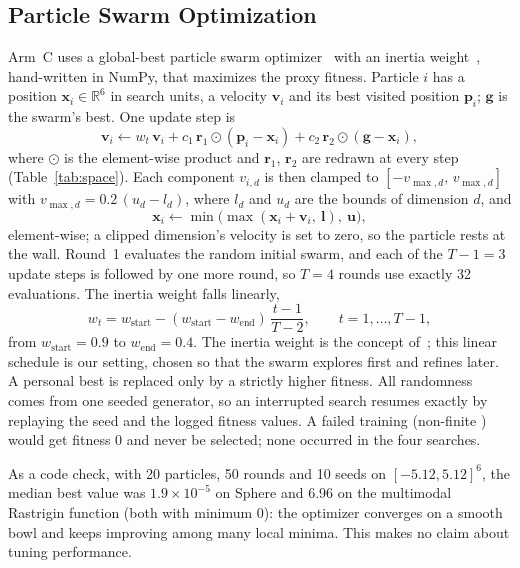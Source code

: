 \subsection{Particle Swarm Optimization}
\label{subsec:pso}

Arm~C uses a global-best particle swarm optimizer~\cite{kennedy1995particle} with an inertia weight~\cite{shi1998modified}, hand-written in NumPy, that maximizes the proxy fitness. Particle $i$ has a position $\mathbf{x}_i \in \mathbb{R}^6$ in search units, a velocity $\mathbf{v}_i$ and its best visited position $\mathbf{p}_i$; $\mathbf{g}$ is the swarm's best. One update step is
\begin{equation}
\mathbf{v}_i \leftarrow w_t\,\mathbf{v}_i + c_1\,\mathbf{r}_1 \odot (\mathbf{p}_i - \mathbf{x}_i) + c_2\,\mathbf{r}_2 \odot (\mathbf{g} - \mathbf{x}_i),
\label{eq:velocity}
\end{equation}
where $\odot$ is the element-wise product and $\mathbf{r}_1$, $\mathbf{r}_2$ are redrawn at every step (Table~\ref{tab:space}). Each component $v_{i,d}$ is then clamped to $[-v_{\max,d},\, v_{\max,d}]$ with $v_{\max,d} = 0.2\,(u_d - l_d)$, where $l_d$ and $u_d$ are the bounds of dimension $d$, and
\begin{equation}
\mathbf{x}_i \leftarrow \min\bigl(\max(\mathbf{x}_i + \mathbf{v}_i,\ \mathbf{l}),\ \mathbf{u}\bigr),
\label{eq:position}
\end{equation}
element-wise; a clipped dimension's velocity is set to zero, so the particle rests at the wall. Round~1 evaluates the random initial swarm, and each of the $T-1 = 3$ update steps is followed by one more round, so $T = 4$ rounds use exactly 32 evaluations. The inertia weight falls linearly,
\begin{equation}
w_t = w_{\mathrm{start}} - (w_{\mathrm{start}} - w_{\mathrm{end}})\,\frac{t-1}{T-2}, \qquad t = 1, \dots, T-1,
\label{eq:inertia}
\end{equation}
from $w_{\mathrm{start}} = 0.9$ to $w_{\mathrm{end}} = 0.4$. The inertia weight is the concept of~\cite{shi1998modified}; this linear schedule is our setting, chosen so that the swarm explores first and refines later. A personal best is replaced only by a strictly higher fitness. All randomness comes from one seeded generator, so an interrupted search resumes exactly by replaying the seed and the logged fitness values. A failed training (non-finite \mapfifty) would get fitness 0 and never be selected; none occurred in the four searches.

As a code check, with 20 particles, 50 rounds and 10 seeds on $[-5.12, 5.12]^6$, the median best value was $1.9\times10^{-5}$ on Sphere and 6.96 on the multimodal Rastrigin function (both with minimum 0): the optimizer converges on a smooth bowl and keeps improving among many local minima. This makes no claim about tuning performance.

